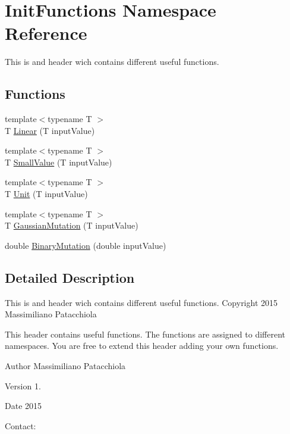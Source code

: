 \hypertarget{namespace_init_functions}{\section{Init\-Functions Namespace Reference}
\label{namespace_init_functions}
}


This is and header wich contains different useful functions.  


\subsection*{Functions}
\begin{DoxyCompactItemize}
\item 
{\footnotesize template$<$typename T $>$ }\\T \hyperlink{namespace_init_functions_a224e8c5e5e4b61ad3049fc595e2592d2}{Linear} (T input\-Value)
\item 
{\footnotesize template$<$typename T $>$ }\\T \hyperlink{namespace_init_functions_aed315ce21509a91d31fa5f8cff75b2da}{Small\-Value} (T input\-Value)
\item 
{\footnotesize template$<$typename T $>$ }\\T \hyperlink{namespace_init_functions_afe89dff533fa5a64df3f80c7d59de8d0}{Unit} (T input\-Value)
\item 
{\footnotesize template$<$typename T $>$ }\\T \hyperlink{namespace_init_functions_a4a8d93995d8a773df46c986385f0caa4}{Gaussian\-Mutation} (T input\-Value)
\item 
double \hyperlink{namespace_init_functions_a3f7bb8d9c5733fb01f5c8be4c20ced4a}{Binary\-Mutation} (double input\-Value)
\end{DoxyCompactItemize}


\subsection{Detailed Description}
This is and header wich contains different useful functions. Copyright 2015 Massimiliano Patacchiola

This header contains useful functions. The functions are assigned to different namespaces. You are free to extend this header adding your own functions.

\begin{DoxyAuthor}{Author}
Massimiliano Patacchiola
\end{DoxyAuthor}
\begin{DoxyVersion}{Version}
1.
\end{DoxyVersion}
\begin{DoxyDate}{Date}
2015
\end{DoxyDate}
Contact\-:

